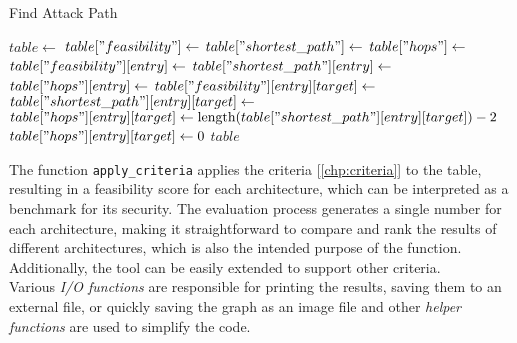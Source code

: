 \begin{algorithm}[h]
    \caption{Find Attack Path}
    \label{alg:findattackpath}
    \begin{algorithmic}[1]
        \State $table \gets$ 
        \State $table["feasibility"] \gets$ 
        \State $table["shortest\_path"] \gets$ 
        \State $table["hops"] \gets$ 
            \State $table["feasibility"][entry] \gets$ 
            \State $table["shortest\_path"][entry] \gets$ 
            \State $table["hops"][entry] \gets$ 
                \State $table["feasibility"][entry][target] \gets$ 
                \State $table["shortest\_path"][entry][target] \gets$ 
                    \State $table["hops"][entry][target] \gets \text{length}(table["shortest\_path"][entry][target]) - 2$
                \Else
                    \State $table["hops"][entry][target] \gets 0$
                \EndIf
            \EndFor
        \EndFor
        \State \Return $table$
    \EndProcedure
    \end{algorithmic}
\end{algorithm}
    

The function \texttt{apply\_criteria} applies the criteria [\ref{chp:criteria}] to the table, 
resulting in a feasibility score for each architecture, 
which can be interpreted as a benchmark for its security. 
The evaluation process generates a single number for each architecture, 
making it straightforward to compare and rank the results of different architectures, 
which is also the intended purpose of the function. 
Additionally, the tool can be easily extended to support other criteria.\\

Various \textit{I/O functions} are responsible for printing the results, saving them to an external file, or quickly saving the graph as an image file
and other \textit{helper functions} are used to simplify the code.\\


